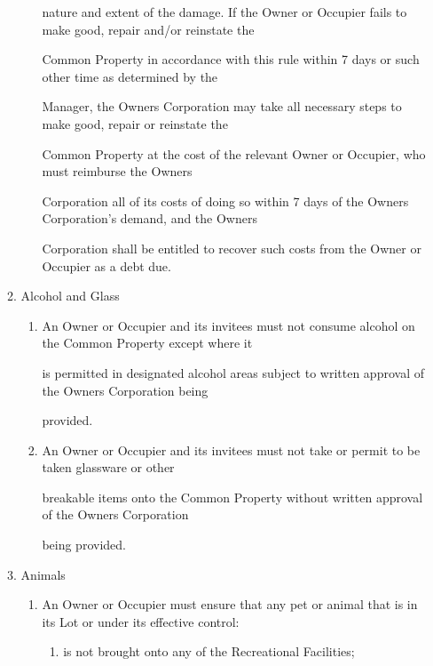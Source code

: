 \documentclass{article}
\begin{document}
\begin{enumerate}[label=\arabic*.]
\begin{enumerate}[label=\arabic{enumi}.\arabic*.]
\begin{enumerate}[label=(\arabic*)]
{\fontsize{10.02}{1}nature and extent of the damage. If the Owner or Occupier fails to make good, repair and/or reinstate the }

{\fontsize{10.02}{1}Common Property in accordance with this rule within 7 days or such other time as determined by the }

{\fontsize{10.02}{1}Manager, the Owners Corporation may take all necessary steps to make good, repair or reinstate the }

{\fontsize{10.02}{1}Common Property at the cost of the relevant Owner or Occupier, who must reimburse the Owners }

{\fontsize{10.02}{1}Corporation all of its costs of doing so within 7 days of the Owners Corporation’s demand, and the Owners }

{\fontsize{10.02}{1}Corporation shall be entitled to recover such costs from the Owner or Occupier as a debt due. }

\end{enumerate}
\item {\fontsize{9.99}{1} Alcohol and Glass }

\begin{enumerate}[label=(\arabic*)]
\item {\fontsize{9.962}{1} An Owner or Occupier and its invitees must not consume alcohol on the Common Property except where it }

{\fontsize{10.02}{1}is permitted in designated alcohol areas subject to written approval of the Owners Corporation being }

{\fontsize{10.02}{1}provided. }

\item {\fontsize{9.962}{1} An Owner or Occupier and its invitees must not take or permit to be taken glassware or other }

{\fontsize{10.02}{1}breakable items onto the Common Property without written approval of the Owners Corporation }

{\fontsize{10.02}{1}being provided. }

\end{enumerate}
\item {\fontsize{9.99}{1} Animals }

\begin{enumerate}[label=(\arabic*)]
\item {\fontsize{9.962}{1} An Owner or Occupier must ensure that any pet or animal that is in its Lot or under its effective control: }

\begin{enumerate}[label=(\alph*)]
\item {\fontsize{9.962}{1} is not brought onto any of the Recreational Facilities; }


\end{enumerate}
\end{enumerate}
\end{enumerate}
\end{enumerate}
\end{document}
